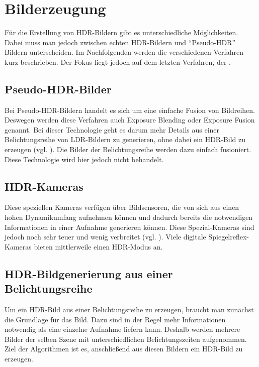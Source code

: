 \section{Bilderzeugung}
Für die Erstellung von \gls{HDR}-Bildern gibt es unterschiedliche Möglichkeiten. Dabei muss man jedoch zwischen echten \gls{HDR}-Bildern und \enquote{Pseudo-\gls{HDR}} Bildern unterscheiden. Im Nachfolgenden werden die verschiedenen Verfahren kurz beschrieben. Der Fokus liegt jedoch auf dem letzten Verfahren, der .


\subsection{Pseudo-\gls{HDR}-Bilder}
Bei Pseudo-\gls{HDR}-Bildern handelt es sich um eine einfache Fusion von Bildreihen. Deswegen werden diese Verfahren auch Exposure Blending oder Exposure Fusion genannt. Bei dieser Technologie geht es darum mehr Details aus einer Belichtungsreihe von \gls{LDR}-Bildern zu generieren, ohne dabei ein \gls{HDR}-Bild zu erzeugen (vgl. \cite{Jing_Hong_Zheng_Rahardja_2012}). Die Bilder der Belichtungsreihe werden dazu einfach fusioniert. Diese Technologie wird hier jedoch nicht behandelt.

\subsection{HDR-Kameras} 
Diese speziellen Kameras verfügen über Bildsensoren, die von sich aus einen hohen Dynamikumfang aufnehmen können und dadurch bereits die notwendigen Informationen in einer Aufnahme generieren können. Diese Spezial-Kameras sind jedoch noch sehr teuer und wenig verbreitet (vgl. \cite[S. 95ff]{Bloch2012}). Viele digitale Spiegelreflex-Kameras bieten mittlerweile einen \gls{HDR}-Modus an.

\subsection{HDR-Bildgenerierung aus einer Belichtungsreihe}
\label{sub:belichtungsreihe}
Um ein \gls{HDR}-Bild aus einer Belichtungsreihe zu erzeugen, braucht man zunächst die Grundlage für das Bild. Dazu sind in der Regel mehr Informationen notwendig als eine einzelne Aufnahme liefern kann. Deshalb werden mehrere Bilder der selben Szene mit unterschiedlichen Belichtungszeiten aufgenommen. Ziel der Algorithmen ist es, anschließend aus diesen Bildern ein \gls{HDR}-Bild zu erzeugen.

